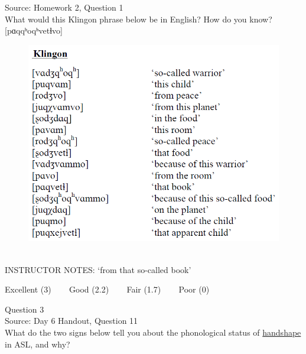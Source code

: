 \documentclass[12pt]{article}
\begin{document}
Source: Homework 2, Question 1\\

What would this Klingon phrase below be in English? How do you know?\\

{[pɑqqʰoqʰvetɬvo]}

\begin{figure}[H]
\includegraphics{../images/klingon.png}
\end{figure}

~\\
INSTRUCTOR NOTES: ‘from that so-called book’


\vfill
Excellent (3) ~~~ Good (2.2) ~~~ Fair (1.7) ~~~ Poor (0)
\newpage

{\large Question 3}\\

Source: Day 6 Handout, Question 11\\

What do the two signs below tell you about the phonological status of \underline{handshape} in ASL, and why?\\
\end{document}

